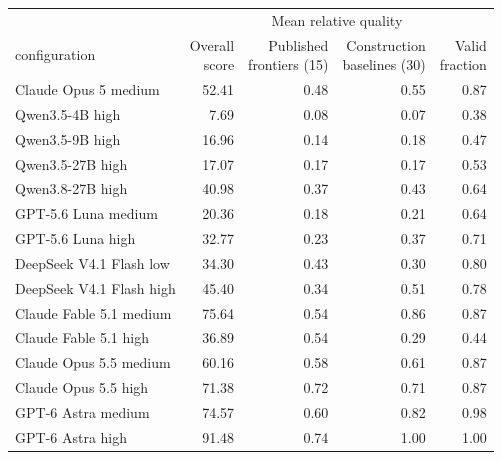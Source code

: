 \begin{tabular}{@{}lrrrr@{}}
\toprule
& & \multicolumn{2}{c}{Mean relative quality} & \\
\cmidrule(lr){3-4}
configuration & \shortstack{Overall\\score} & \shortstack{Published\\frontiers (15)} & \shortstack{Construction\\baselines (30)} & \shortstack{Valid\\fraction} \\
\midrule
Claude Opus 5 medium & 52.41 & 0.48 & 0.55 & 0.87 \\
Qwen3.5-4B high & 7.69 & 0.08 & 0.07 & 0.38 \\
Qwen3.5-9B high & 16.96 & 0.14 & 0.18 & 0.47 \\
Qwen3.5-27B high & 17.07 & 0.17 & 0.17 & 0.53 \\
Qwen3.8-27B high & 40.98 & 0.37 & 0.43 & 0.64 \\
GPT-5.6 Luna medium & 20.36 & 0.18 & 0.21 & 0.64 \\
GPT-5.6 Luna high & 32.77 & 0.23 & 0.37 & 0.71 \\
DeepSeek V4.1 Flash low & 34.30 & 0.43 & 0.30 & 0.80 \\
DeepSeek V4.1 Flash high & 45.40 & 0.34 & 0.51 & 0.78 \\
Claude Fable 5.1 medium & 75.64 & 0.54 & 0.86 & 0.87 \\
Claude Fable 5.1 high & 36.89 & 0.54 & 0.29 & 0.44 \\
Claude Opus 5.5 medium & 60.16 & 0.58 & 0.61 & 0.87 \\
Claude Opus 5.5 high & 71.38 & 0.72 & 0.71 & 0.87 \\
GPT-6 Astra medium & 74.57 & 0.60 & 0.82 & 0.98 \\
GPT-6 Astra high & 91.48 & 0.74 & 1.00 & 1.00 \\
\bottomrule
\end{tabular}
